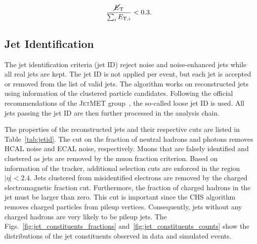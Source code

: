 \begin{equation}
    \frac{\cancel{E}_{\mathrm{T}}}{\sum_i E_{\mathrm{T},i}} < 0.3.
\end{equation}

\subsection{Jet Identification}

The jet identification criteria (jet ID) reject noise and noise-enhanced jets
while all real jets are kept. The jet ID is not applied per event, but each jet
is accepted or removed from the list of valid jets. The algorithm works on
reconstructed jets using information of the clustered particle candidates.
Following the official recommendations of the \textsc{JetMET}
group~\cite{jetmet:jetid}, the so-called loose jet ID is used. All jets passing the jet ID
are then further processed in the analysis chain. 

The properties of the reconstructed jets and their respective cuts are listed in
Table~\ref{tab:jetid}. The cut on the fraction of neutral hadrons and photons
removes HCAL noise and ECAL noise, respectively. Muons that are falsely
identified and clustered as jets are removed by the muon fraction criterion.
Based on information of the tracker, additional selection cuts are enforced in
the region $|\eta| < 2.4$. Jets clustered from misidentified electrons are removed by the
charged electromagnetic fraction cut. Furthermore, the fraction of charged hadrons in the
jet must be larger than zero. This cut is important since the CHS algorithm
removes charged particles from pileup vertices. Consequently, jets without any
charged hadrons are very likely to be pileup jets. The
Figs.~\ref{fig:jet_constituents_fractions} and~\ref{fig:jet_constituents_counts}
show the distributions of the jet constituents observed in data and simulated
events.

